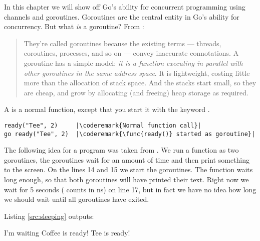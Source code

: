 \noindent{}In this chapter we will show off Go's ability for
concurrent programming using channels and goroutines. Goroutines
are the central entity in Go's ability for concurrency. But what
\emph{is} a goroutine? From \cite{effective_go}:
\begin{quote}
They're called goroutines because the existing terms --- threads, coroutines,
processes, and so on --- convey inaccurate connotations. A goroutine has a simple
model: \emph{it is a function executing in parallel with other goroutines in the same
address space}. It is lightweight, costing little more than the allocation of
stack space. And the stacks start small, so they are cheap, and grow by
allocating (and freeing) heap storage as required.
\end{quote}
A  is a normal function, except that you start
it with the keyword .
\begin{lstlisting}
ready("Tee", 2)	    |\coderemark{Normal function call}|
go ready("Tee", 2)  |\coderemark{\func{ready()} started as goroutine}|
\end{lstlisting}
The following idea for a program was taken from \cite{go_course_day3}. 
We run a function as two goroutines, the goroutines wait for an amount of
time and then print something to the screen. 
On the lines 14 and 15 we start the goroutines.
The  function
waits long enough, so that both goroutines will have printed their text. Right
now we wait for 5 seconds ( counts in ns) on line 17, but in fact we have no idea how
long we should wait until all goroutines have exited.

Listing \ref{src:sleeping} outputs:
\begin{display}
I'm waiting         
Coffee is ready!    
Tee is ready!       
\end{display}

